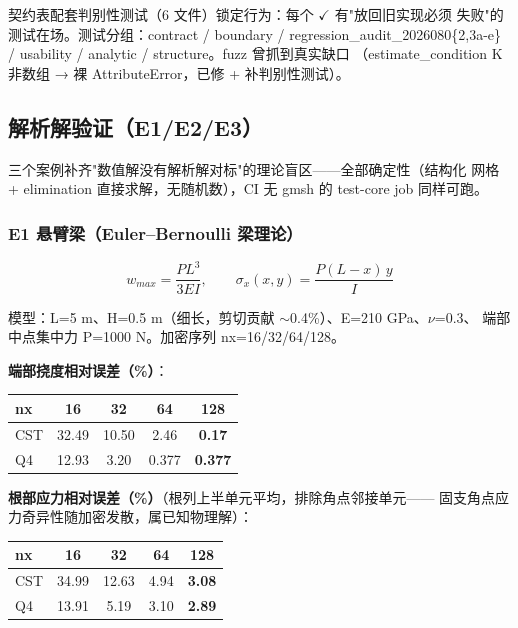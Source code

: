 \documentclass[12pt,a4paper]{ctexart}
\begin{document}
契约表配套判别性测试（6 文件）锁定行为：每个 $\checkmark$ 有"放回旧实现必须
失败"的测试在场。测试分组：contract / boundary / regression\_audit\_2026080\{2,3a-e\}
/ usability / analytic / structure。fuzz 曾抓到真实缺口
（estimate\_condition K 非数组 → 裸 AttributeError，已修 + 补判别性测试）。

\subsection{解析解验证（E1/E2/E3）}

三个案例补齐"数值解没有解析解对标"的理论盲区——全部确定性（结构化
网格 + elimination 直接求解，无随机数），CI 无 gmsh 的 test-core job
同样可跑。

\subsubsection{E1 悬臂梁（Euler--Bernoulli 梁理论）}

$$w_{max} = \frac{PL^3}{3EI}, \qquad \sigma_x(x,y) = \frac{P(L-x)\,y}{I}$$

模型：L=5 m、H=0.5 m（细长，剪切贡献 $\sim$0.4\%）、E=210 GPa、$\nu$=0.3、
端部中点集中力 P=1000 N。加密序列 nx=16/32/64/128。

\textbf{端部挠度相对误差（\%）}：

\begin{table}[h]
\centering
\small
\begin{tabular}{lcccc}
\toprule
nx & 16 & 32 & 64 & 128 \\
\midrule
CST & 32.49 & 10.50 & 2.46 & \textbf{0.17} \\
Q4 & 12.93 & 3.20 & 0.377 & \textbf{0.377} \\
\bottomrule
\end{tabular}
\end{table}

\textbf{根部应力相对误差（\%）}（根列上半单元平均，排除角点邻接单元——
固支角点应力奇异性随加密发散，属已知物理解）：

\begin{table}[h]
\centering
\small
\begin{tabular}{lcccc}
\toprule
nx & 16 & 32 & 64 & 128 \\
\midrule
CST & 34.99 & 12.63 & 4.94 & \textbf{3.08} \\
Q4 & 13.91 & 5.19 & 3.10 & \textbf{2.89} \\
\bottomrule
\end{tabular}
\end{table}
\end{document}
